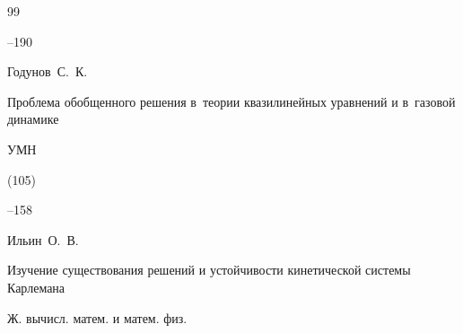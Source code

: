 \begin{thebibliography}{99}


--190














\by Годунов~С.~К.

\paper Проблема обобщенного решения в~теории квазилинейных уравнений и в~газовой динамике

\jour УМН



(105)

--158














\by Ильин~О.~В.

\paper Изучение существования решений и устойчивости кинетической системы Карлемана

\jour Ж. вычисл. матем. и матем. физ.





\end{thebibliography}
